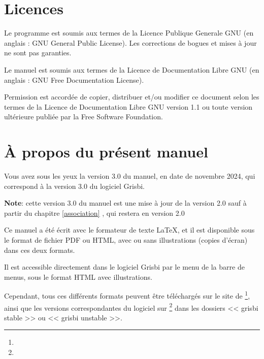 \section{Licences\label{introduction-licenses}}


Le programme est soumis aux termes de la \gls{Licence Publique Generale GNU}
(en anglais : \gls{GNU General Public License}). Les corrections de bogues et mises à jour ne sont pas garanties.

Le manuel est soumis aux termes de la \gls{Licence de Documentation Libre GNU} (en anglais : \gls{GNU Free Documentation License}).

Permission est accordée de copier, distribuer et/ou modifier ce document
selon les termes de la Licence de Documentation Libre GNU version 1.1 ou toute version ultérieure publiée par la \gls{Free Software Foundation}.


\section{À propos du présent manuel\label{introduction-manual}}


Vous avez sous les yeux la version \actuality{}3.0 du manuel, en date de \actuality{}novembre 2024, qui correspond à la version 3.0 du logiciel Grisbi.


\textbf{Note}: cette version 3.0 du manuel est une mise à jour de la version 2.0 sauf à partir du chapitre \vref{association} , qui restera en version 2.0 %


Ce manuel a été écrit avec le \gls{formateur de texte} \gls{LaTeX}, et il est disponible sous le \gls{format de fichier} \gls{PDF} ou \gls{HTML}, avec ou sans %
 illustrations (copies d'écran) dans ces deux formats. 

Il est accessible directement dans le logiciel Grisbi par le menu  de la barre de menus, sous le format \gls{HTML} avec illustrations.

Cependant, tous ces différents formats peuvent être téléchargés sur le site de \footnote{\urlSourceForgeDocumentation{}}, ainsi que les versions correspondantes du logiciel sur \footnote{\urlSourceForge{}} dans les dossiers << \textsf{grisbi stable} >> ou << \textsf{grisbi unstable} >>.

